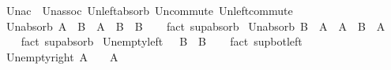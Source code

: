 \begin{isabellebody}
%
\endisadelimproof
\isanewline
{}\isamarkupfalse%
\ Un{\isacharunderscore}{\kern0pt}ac\ {\isacharequal}{\kern0pt}\ Un{\isacharunderscore}{\kern0pt}assoc\ Un{\isacharunderscore}{\kern0pt}left{\isacharunderscore}{\kern0pt}absorb\ Un{\isacharunderscore}{\kern0pt}commute\ Un{\isacharunderscore}{\kern0pt}left{\isacharunderscore}{\kern0pt}commute\isanewline
\ \ %
\isanewline
\isanewline
{}\isamarkupfalse%
\ Un{\isacharunderscore}{\kern0pt}absorb{}{\isacharcolon}{\kern0pt}\ {\isachardoublequoteopen}A\ {\isasymsubseteq}\ B\ {\isasymLongrightarrow}\ A\ {\isasymunion}\ B\ {\isacharequal}{\kern0pt}\ B{\isachardoublequoteclose}\isanewline
%
\isadelimproof
\ \ %
\endisadelimproof
%
\isatagproof
{}\isamarkupfalse%
\ {\isacharparenleft}{\kern0pt}fact\ sup{\isacharunderscore}{\kern0pt}absorb{}{\isacharparenright}{\kern0pt}%
\endisatagproof
{\isafoldproof}%
%
\isadelimproof
\isanewline
%
\endisadelimproof
\isanewline
{}\isamarkupfalse%
\ Un{\isacharunderscore}{\kern0pt}absorb{}{\isacharcolon}{\kern0pt}\ {\isachardoublequoteopen}B\ {\isasymsubseteq}\ A\ {\isasymLongrightarrow}\ A\ {\isasymunion}\ B\ {\isacharequal}{\kern0pt}\ A{\isachardoublequoteclose}\isanewline
%
\isadelimproof
\ \ %
\endisadelimproof
%
\isatagproof
{}\isamarkupfalse%
\ {\isacharparenleft}{\kern0pt}fact\ sup{\isacharunderscore}{\kern0pt}absorb{}{\isacharparenright}{\kern0pt}%
\endisatagproof
{\isafoldproof}%
%
\isadelimproof
\isanewline
%
\endisadelimproof
\isanewline
{}\isamarkupfalse%
\ Un{\isacharunderscore}{\kern0pt}empty{\isacharunderscore}{\kern0pt}left{\isacharcolon}{\kern0pt}\ {\isachardoublequoteopen}{\isacharbraceleft}{\kern0pt}{\isacharbraceright}{\kern0pt}\ {\isasymunion}\ B\ {\isacharequal}{\kern0pt}\ B{\isachardoublequoteclose}\isanewline
%
\isadelimproof
\ \ %
\endisadelimproof
%
\isatagproof
{}\isamarkupfalse%
\ {\isacharparenleft}{\kern0pt}fact\ sup{\isacharunderscore}{\kern0pt}bot{\isacharunderscore}{\kern0pt}left{\isacharparenright}{\kern0pt}%
\endisatagproof
{\isafoldproof}%
%
\isadelimproof
%
\endisadelimproof
\ \isanewline
\isanewline
{}\isamarkupfalse%
\ Un{\isacharunderscore}{\kern0pt}empty{\isacharunderscore}{\kern0pt}right{\isacharcolon}{\kern0pt}\ {\isachardoublequoteopen}A\ {\isasymunion}\ {\isacharbraceleft}{\kern0pt}{\isacharbraceright}{\kern0pt}\ {\isacharequal}{\kern0pt}\ A{\isachardoublequoteclose}\isanewline
%
\isadelimproof
\ \ %
\endisadelimproof
%
\isatagproof

\end{isabellebody}
